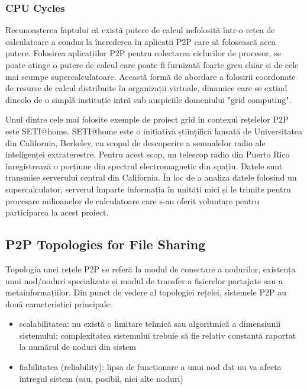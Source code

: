 \subsubsection{CPU Cycles}

Recunoașterea faptului că există putere de calcul nefolosită într-o rețea de
calculatoare a condus la încrederea în aplicații P2P care să folosească acea
putere. Folosirea aplicațiilor P2P pentru colectarea ciclurilor de procesor,
se poate atinge o putere de calcul care poate fi furnizată foarte greu chiar
și de cele mai scumpe supercalculatoare. Această formă de abordare a folosirii
coordonate de resurse de calcul distribuite în organizații virtuale, dinamice
care se extind dincolo de o simplă instituție intră sub auspiciile domeniului
"grid computing".

Unul dintre cele mai folosite exemple de proiect grid în contexul rețelelor
P2P este SETI@home. SETI@home este o inițiativă științifică lansată de
Universitatea din California, Berkeley, cu scopul de descoperire a semnalelor
radio ale inteligenței extraterestre. Pentru acest scop, un telescop radio din
Puerto Rico înregistrează o porțiune din spectrul electromagnetic din spațiu.
Datele sunt transmise serverului central din California. În loc de a analiza
datele folosind un supercalculator, serverul împarte informația în unități
mici și le trimite pentru procesare milioanelor de calculatoare care s-au
oferit voluntare pentru participarea la acest proiect.

\subsection{P2P Topologies for File Sharing}

Topologia unei rețele P2P se referă la modul de conectare a nodurilor,
existența unui nod/noduri specializate și modul de transfer a fișierelor
partajate sau a metainformațiilor. Din punct de vedere al topologiei rețelei,
sistemele P2P au două caracteristici principale:

\begin{itemize}
  \item scalabilitatea: nu există o limitare tehnică sau algoritmică a
  dimensiunii sistemului; complexitatea sistemului trebuie să fie relativ
  constantă raportat la numărul de noduri din sistem
  \item fiabilitatea (reliability): lipsa de funcționare a unui nod dat nu va
  afecta întregul sistem (sau, posibil, nici alte noduri)
\end{itemize}

